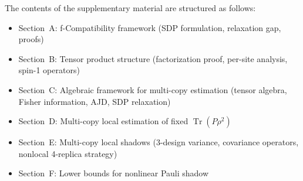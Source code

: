\documentclass[aps,%
twocolumn,%
floatfix,%
pra,%
amsfonts,%
groupedaddress,%
superscriptaddress]{revtex4-2}%
\DeclareMathOperator{\tr}{Tr}
\newcommand{\1}{\mathbbm{1}}
\begin{document}
\makeatletter%
\newcommand{\appendixmaketitle}{%
\begin{center}%
\vspace{0.4in}%
{\Large \@title \par}%
\end{center}%
\par%
}%
\makeatother%

\setcounter{secnumdepth}{2}
\appendix
\widetext
\newpage

\appendixmaketitle
\vspace{0.2in}

The contents of the supplementary material are structured as follows:
\begin{itemize}
\item Section~A: f-Compatibility framework (SDP formulation, relaxation gap, proofs)
\item Section~B: Tensor product structure (factorization proof, per-site analysis, spin-1 operators)
\item Section~C: Algebraic framework for multi-copy estimation (tensor algebra, Fisher information, AJD, SDP relaxation)
\item Section~D: Multi-copy local estimation of fixed $\tr(P\rho^2)$
\item Section~E: Multi-copy local shadows (3-design variance, covariance operators, nonlocal 4-replica strategy)
\item Section~F: Lower bounds for nonlinear Pauli shadow
\end{itemize}
\end{document}
